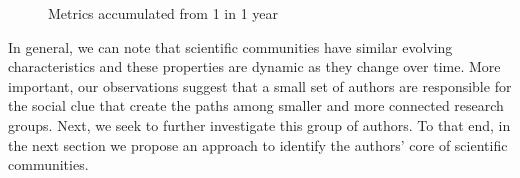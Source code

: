 \begin{figure}[!htb]
\begin{center}
{  }%
  \end{center}
  \caption{Metrics accumulated from 1 in 1 year}
  \label{fig:metrics_accumulated_1_in_1}
\end{figure}

In general, we can note that scientific communities have similar evolving characteristics and these properties are dynamic as they change over time.  More important, our observations suggest that a small set of authors are responsible for the social clue that create the paths among smaller and more connected research groups. Next, we seek to further investigate this group of authors. To that end, in the next section we propose an approach to identify the authors' core of scientific communities.








